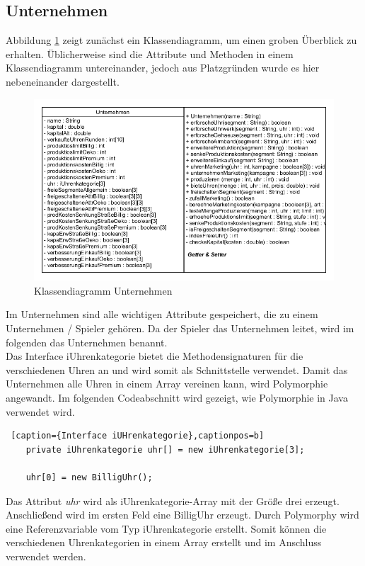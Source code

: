 \newpage
\subsection{Unternehmen}
Abbildung \ref{fig:abb2} zeigt zunächst ein Klassendiagramm, um einen groben Überblick zu erhalten. Üblicherweise sind die Attribute und Methoden in einem Klassendiagramm untereinander, jedoch aus Platzgründen wurde es hier nebeneinander dargestellt.

\begin{figure} [h]
	\centering
	\includegraphics[scale=0.6]{img/Unternehmen.png} 	
	\caption{Klassendiagramm Unternehmen} \label{fig:abb2}
\end{figure}

Im Unternehmen sind alle wichtigen Attribute gespeichert, die zu einem Unternehmen / Spieler gehören. Da der Spieler das Unternehmen leitet, wird im folgenden das Unternehmen benannt. \\

Das Interface iUhrenkategorie bietet die Methodensignaturen für die verschiedenen Uhren an und wird somit als Schnittstelle verwendet. Damit das Unternehmen alle Uhren in einem Array vereinen kann, wird Polymorphie angewandt. Im folgenden Codeabschnitt wird gezeigt, wie Polymorphie in Java verwendet wird. \\

\lstset{language=Java} 
\begin{lstlisting} [caption={Interface iUHrenkategorie},captionpos=b]
	private iUhrenkategorie uhr[] = new iUhrenkategorie[3];
	
	uhr[0] = new BilligUhr();
\end{lstlisting}

Das Attribut \textit{uhr} wird als iUhrenkategorie-Array mit der Größe drei erzeugt. Anschließend wird im ersten Feld eine BilligUhr erzeugt. Durch Polymorphy wird eine Referenzvariable vom Typ iUhrenkategorie erstellt. Somit können die verschiedenen Uhrenkategorien in einem Array erstellt und im Anschluss verwendet werden. 

